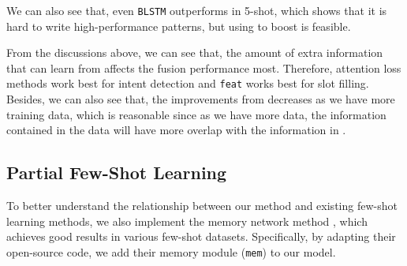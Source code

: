 
We can also see that, even \texttt{BLSTM} outperforms \RE in 5-shot, which shows that it is hard to write high-performance \RE patterns, but using \RE to boost \NN is feasible.

From the discussions above, we can see that, the amount of extra information that \NN can learn from \RE affects the fusion performance most. Therefore, attention loss methods work best for intent detection and \texttt{feat} works best for slot filling.
Besides, we can also see that, the improvements from \RE decreases as we have more training data, which is reasonable since as we have more data, the information contained in the data will have more overlap with the information in \RE.


\subsection{Partial Few-Shot Learning}
To better understand the relationship between our method and existing few-shot learning methods, we also implement the memory network method \cite{kaiser2017learning}, which achieves good results in various few-shot datasets. Specifically, by adapting their open-source code, we add their memory module (\texttt{mem}) to our \BLSTM model.

